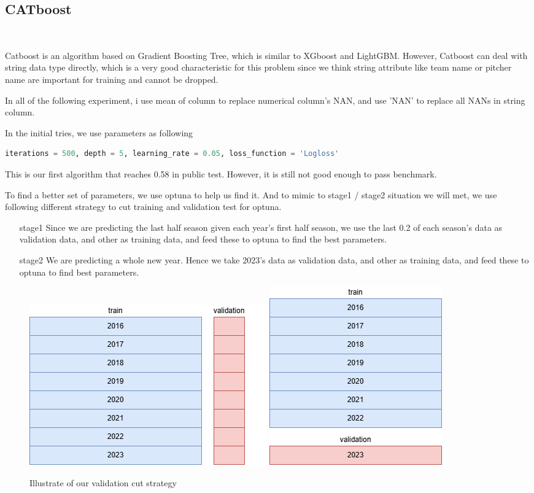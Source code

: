 \subsection*{CATboost}
\ \par Catboost is an algorithm based on Gradient Boosting Tree, which is similar to XGboost and LightGBM. However, Catboost can deal with string data type directly, which is a very good characteristic for this problem since we think string attribute like team name or pitcher name are important for training and cannot be dropped. 
\par In all of the following experiment, i use mean of column to replace numerical column's NAN, and use 'NAN' to replace all NANs in string column. 
\par In the initial tries, we use parameters as following
\begin{lstlisting}[language=Python]
iterations = 500, depth = 5, learning_rate = 0.05, loss_function = 'Logloss'
\end{lstlisting}
\par This is our first algorithm that reaches 0.58 in public test. However, it is still not good enough to pass benchmark. 
\par To find a better set of parameters, we use optuna to help us find it. And to mimic to stage1 / stage2 situation we will met, we use following different strategy to cut training and validation test for optuna.
\begin{itemize}
    \item[stage1] Since we are predicting the last half season given each year's first half season, we use the last 0.2 of each season's data as validation data, and other as training data, and feed these to optuna to find the best parameters.
    \item[stage2] We are predicting a whole new year. Hence we take 2023's data as validation data, and other as training data, and feed these to optuna to find best parameters.
\end{itemize}
\begin{figure}[h]
    \centering
    \includegraphics[width=0.25\linewidth]{Pictures/MLdatacut_stage1.drawio.png}
    \includegraphics[width=0.17\linewidth]{Pictures/MLdatacut_stage2.drawio.png}
    \caption{Illustrate of our validation cut strategy}
\end{figure}
